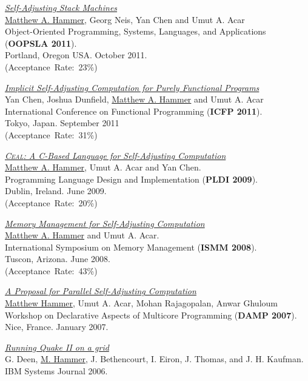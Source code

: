\documentclass[10pt,letterpaper]{article}
\newcommand{\BeanCounter}[1]{(Acceptance~Rate:~#1\%)}
\renewenvironment{itemize}{
  \begin{list}{}{
    \setlength{\leftmargin}{1.5em}
    \setlength{\itemsep}{0.25em}
    \setlength{\parskip}{0pt}
    \setlength{\parsep}{0.25em}
  }
}{
  \end{list}
}
\begin{document}
\begin{itemize}
\item
\href{http://www.cs.umd.edu/~hammer/oopsla11}
{\textit{Self-Adjusting Stack Machines}}
\\
\underline{Matthew A. Hammer}, Georg Neis, Yan Chen and Umut A. Acar 
\\
Object-Oriented Programming, Systems, Languages, and Applications
(\textbf{OOPSLA 2011}).
\\
Portland, Oregon USA. October 2011.
\\
\BeanCounter{23}

\item
\href{http://www.cs.umd.edu/~hammer/icfp11}
{\textit{Implicit Self-Adjusting Computation for Purely Functional Programs}}
\\
Yan Chen, Joshua Dunfield, \underline{Matthew A. Hammer} and Umut A. Acar 
\\
International Conference on Functional Programming (\textbf{ICFP 2011}).
\\
Tokyo, Japan. September 2011
\\
\BeanCounter{31}

\item
\href{http://www.cs.umd.edu/~hammer/pldi09}
{\textit{\textsc{Ceal}: A C-Based Language for Self-Adjusting Computation}}
\\
\underline{Matthew A. Hammer}, Umut A. Acar and Yan Chen.
\\
Programming Language Design and Implementation (\textbf{PLDI 2009}).
\\
Dublin, Ireland. June 2009.
\\
\BeanCounter{20}

\item
\href{http://www.cs.umd.edu/~hammer/ismm08}
{\textit{Memory Management for Self-Adjusting Computation}}
\\
\underline{Matthew A. Hammer} and Umut A. Acar.
\\
International Symposium on Memory Management (\textbf{ISMM 2008}).
\\
Tuscon, Arizona. June 2008.
\\
\BeanCounter{43}

\item
\href{http://www.cs.umd.edu/~hammer/papers/damp07.pdf}
{\textit{A Proposal for Parallel Self-Adjusting Computation}}
\\
\underline{Matthew Hammer}, Umut A. Acar, Mohan Rajagopalan, Anwar Ghuloum
\\
Workshop on Declarative Aspects of Multicore Programming (\textbf{DAMP 2007}).
\\
Nice, France. January 2007.

\item
\href{http://www.cs.umd.edu/~hammer/papers/ibmsj06quake.pdf}
{\textit{Running Quake II on a grid}}
\\
G. Deen, \underline{M. Hammer}, J. Bethencourt, I. Eiron, J. Thomas, and J. H. Kaufman.
\\
IBM Systems Journal 2006.

\end{itemize}
\end{document}
